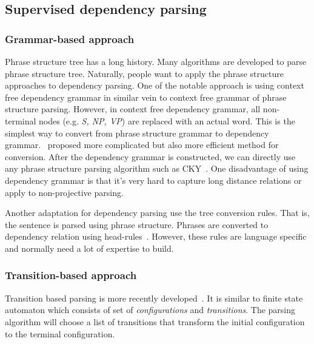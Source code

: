 \documentclass[12pt,twoside,final,hidelinks]{ltthesis}
\theoremstyle{definition}
\begin{document}
\subsection{Supervised dependency parsing}
\label{sec:monolingualDep}
\subsubsection{Grammar-based approach}
Phrase structure tree has a long history. Many algorithms are developed to parse phrase structure tree. Naturally, people want to apply the phrase structure approaches to dependency parsing. One of the notable approach is using context free dependency grammar in similar vein to context free grammar of phrase structure parsing. However, in context free dependency grammar, all non-terminal nodes (e.g. \textit{S, NP, VP}) are replaced with an actual word. This is the simplest way to convert from phrase structure grammar to dependency grammar.~ proposed more complicated but also more efficient method for conversion. After the dependency grammar is constructed, we can directly use any phrase structure parsing algorithm such as CKY~\cite{Younger1967189}. One disadvantage of using dependency grammar is that it's very hard to capture long distance relations or apply to non-projective parsing.  

Another adaptation for dependency parsing use the tree conversion rules. That is, the sentence is parsed using phrase structure. Phrases are converted to dependency relation using head-rules~\cite{Marneffe06generatingtyped,Yamada03statisticaldependency}. However, these rules are language specific and normally need a lot of expertise to build. 

\subsubsection{Transition-based approach}
Transition based parsing is more recently developed~\cite{Nivre:2008:ADI}. It is similar to finite state automaton which consists of set of \textit{configurations} and \textit{transitions}. The parsing algorithm will choose a list of transitions that transform the initial configuration to the terminal configuration. 
\end{document}
